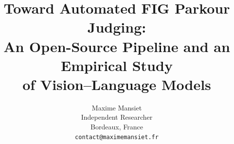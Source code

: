 \documentclass[10pt,twocolumn,letterpaper]{article}
\title{Toward Automated FIG Parkour Judging:\\An Open-Source Pipeline and an Empirical Study\\of Vision--Language Models}
\author{Maxime Mansiet\\
Independent Researcher\\
Bordeaux, France\\
{\tt\small contact@maximemansiet.fr}
}
\begin{document}
\maketitle











{
    \small
    
    
}

\appendix

\end{document}
